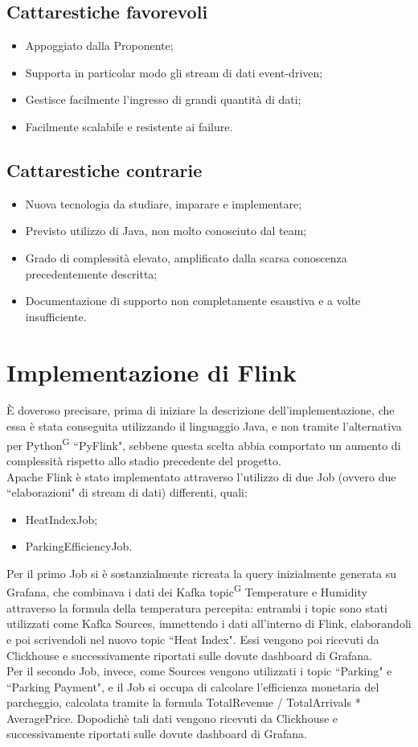 \documentclass[8pt]{article}
\newcommand{\glossterm}[1]{#1\textsuperscript{G}} %
\begin{document}
\subsection{Cattarestiche favorevoli}
\begin{itemize}
	\item Appoggiato dalla Proponente;
	\item Supporta in particolar modo gli stream di dati event-driven; 
	\item Gestisce facilmente l'ingresso di grandi quantità di dati;
	\item Facilmente scalabile e resistente ai failure.
\end{itemize}
\subsection{Cattarestiche contrarie}
\begin{itemize}
	\item Nuova tecnologia da studiare, imparare e implementare;
	\item Previsto utilizzo di Java, non molto conosciuto dal team;
	\item Grado di complessità elevato, amplificato dalla scarsa conoscenza precedentemente descritta;
	\item Documentazione di supporto non completamente esaustiva e a volte insufficiente.
\end{itemize}
\section{Implementazione di Flink}
È doveroso precisare, prima di iniziare la descrizione dell'implementazione, che essa è stata conseguita utilizzando il linguaggio Java, e non tramite l'alternativa
per \glossterm{Python} ``PyFlink", sebbene questa scelta abbia comportato un aumento di complessità rispetto allo stadio precedente del progetto.\\
Apache Flink è stato implementato attraverso l'utilizzo di due Job (ovvero due ``elaborazioni" di stream di dati) differenti, quali:
\begin{itemize}
	\item HeatIndexJob;
	\item ParkingEfficiencyJob.
\end{itemize}
Per il primo Job si è sostanzialmente ricreata la query inizialmente generata su Grafana, che combinava i dati dei Kafka \glossterm{topic} Temperature e Humidity attraverso 
la formula della temperatura percepita: entrambi i topic sono stati utilizzati come Kafka Sources, immettendo i dati all'interno di Flink, elaborandoli e poi scrivendoli 
nel nuovo topic ``Heat Index". Essi vengono poi ricevuti da Clickhouse e successivamente riportati sulle dovute dashboard di Grafana. \\
Per il secondo Job, invece, come Sources vengono utilizzati i topic ``Parking" e ``Parking Payment", e il Job si occupa di calcolare l'efficienza monetaria del parcheggio, calcolata tramite 
la formula Total\textunderscore Revenue / Total\textunderscore Arrivals * Average\textunderscore Price. Dopodichè tali dati vengono ricevuti da Clickhouse e successivamente riportati sulle dovute dashboard di Grafana. 
\end{document}
